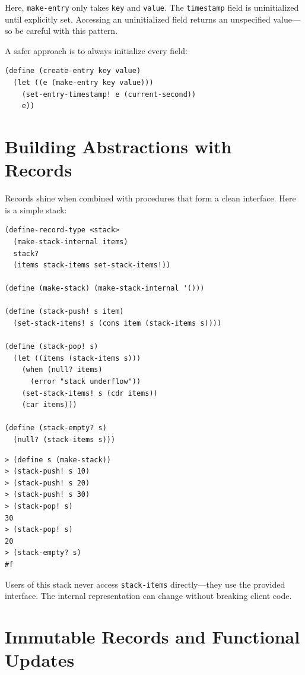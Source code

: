 Here, \texttt{make-entry} only takes \texttt{key} and \texttt{value}. The \texttt{timestamp} field is uninitialized until explicitly set. Accessing an uninitialized field returns an unspecified value---so be careful with this pattern.

A safer approach is to always initialize every field:

\begin{lstlisting}
(define (create-entry key value)
  (let ((e (make-entry key value)))
    (set-entry-timestamp! e (current-second))
    e))
\end{lstlisting}

\section{Building Abstractions with Records}

Records shine when combined with procedures that form a clean interface. Here is a simple stack:

\begin{lstlisting}
(define-record-type <stack>
  (make-stack-internal items)
  stack?
  (items stack-items set-stack-items!))

(define (make-stack) (make-stack-internal '()))

(define (stack-push! s item)
  (set-stack-items! s (cons item (stack-items s))))

(define (stack-pop! s)
  (let ((items (stack-items s)))
    (when (null? items)
      (error "stack underflow"))
    (set-stack-items! s (cdr items))
    (car items)))

(define (stack-empty? s)
  (null? (stack-items s)))
\end{lstlisting}

\begin{lstlisting}[style=repl]
> (define s (make-stack))
> (stack-push! s 10)
> (stack-push! s 20)
> (stack-push! s 30)
> (stack-pop! s)
30
> (stack-pop! s)
20
> (stack-empty? s)
#f
\end{lstlisting}

Users of this stack never access \texttt{stack-items} directly---they use the provided interface. The internal representation can change without breaking client code.

\section{Immutable Records and Functional Updates}

